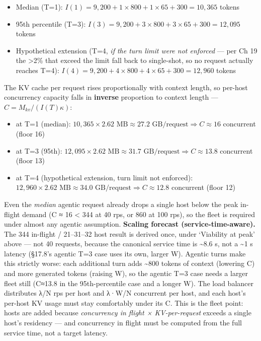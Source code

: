 \begin{itemize}
\tightlist
\item
  Median (T=1):
  \(I(1) = 9{,}200 + 1 \times 800 + 1 \times 65 + 300 = 10{,}365\)
  tokens
\item
  95th percentile (T=3):
  \(I(3) = 9{,}200 + 3 \times 800 + 3 \times 65 + 300 = 12{,}095\)
  tokens
\item
  Hypothetical extension (T=4, \emph{if the turn limit were not
  enforced} --- per Ch 19 the \textgreater2\% that exceed the limit fall
  back to single-shot, so no request actually reaches T=4):
  \(I(4) = 9{,}200 + 4 \times 800 + 4 \times 65 + 300 = 12{,}960\)
  tokens
\end{itemize}

The KV cache per request rises proportionally with context length, so
per-host concurrency capacity falls in \textbf{inverse} proportion to
context length --- \(C = M_{kv}/(I(T)\kappa)\):

\begin{itemize}
\tightlist
\item
  at T=1 (median):
  \(10{,}365 \times 2.62 \text{ MB} \approx 27.2 \text{ GB/request} \Rightarrow C \approx 16\)
  concurrent (floor 16)
\item
  at T=3 (95th):
  \(12{,}095 \times 2.62 \text{ MB} \approx 31.7 \text{ GB/request} \Rightarrow C \approx 13.8\)
  concurrent (floor 13)
\item
  at T=4 (hypothetical extension, turn limit not enforced):
  \(12{,}960 \times 2.62 \text{ MB} \approx 34.0 \text{ GB/request} \Rightarrow C \approx 12.8\)
  concurrent (floor 12)
\end{itemize}

Even the \emph{median} agentic request already drops a single host below
the peak in-flight demand (C ≈ 16 \textless{} 344 at 40 rps, or 860 at
100 rps), so the fleet is required under almost any agentic assumption.
\textbf{Scaling forecast (service-time-aware).} The 344 in-flight /
21--31--32 host result is derived once, under `Viability at peak' above
--- not 40 requests, because the canonical service time is
\textasciitilde8.6 s, not a \textasciitilde1 s latency (§17.8's agentic
T=3 case uses its own, larger W). Agentic turns make this strictly
worse: each additional turn adds \textasciitilde800 tokens of context
(lowering C) and more generated tokens (raising W), so the agentic T=3
case needs a larger fleet still (C≈13.8 in the 95th-percentile case and
a longer W). The load balancer distributes λ/N rps per host and λ·W/N
concurrent per host, and each host's per-host KV usage must stay
comfortably under its C. This is the fleet point: hosts are added
because \emph{concurrency in flight × KV-per-request} exceeds a single
host's residency --- and concurrency in flight must be computed from the
full service time, not a target latency.

